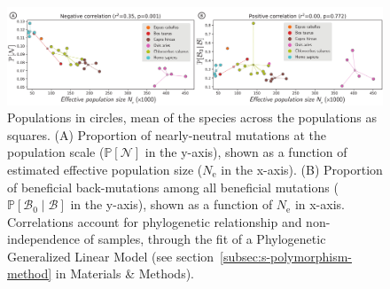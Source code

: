 \documentclass{article}
\newcommand{\Ne}{N_{\text{e}}}
\newcommand{\proba}{\mathbb{P}}
\newcommand{\SphyBen}{\mathcal{B}_0}
\newcommand{\given}{\mid}
\newcommand{\SpopNeu}{\mathcal{N}}
\newcommand{\SpopBen}{\mathcal{B}}
\begin{document}
    \begin{figure}[!ht]
        \centering
        \includegraphics[width=\textwidth, page=1] {artworks/figure.diversity}
        \caption{
            Populations in circles, mean of the species across the populations as squares.
            (A) Proportion of nearly-neutral mutations at the population scale ($\proba [ \SpopNeu]$ in the y-axis), shown as a function of estimated effective population size ($\Ne$ in the x-axis).
            (B) Proportion of beneficial back-mutations among all beneficial mutations ($\proba [ \SphyBen  \given  \SpopBen]$ in the y-axis), shown as a function of $\Ne$ in x-axis.
            Correlations account for phylogenetic relationship and non-independence of samples, through the fit of a Phylogenetic Generalized Linear Model (see section~\ref{subsec:s-polymorphism-method} in Materials \& Methods).
        }
        \label{fig:diversity}
    \end{figure}
\end{document}
